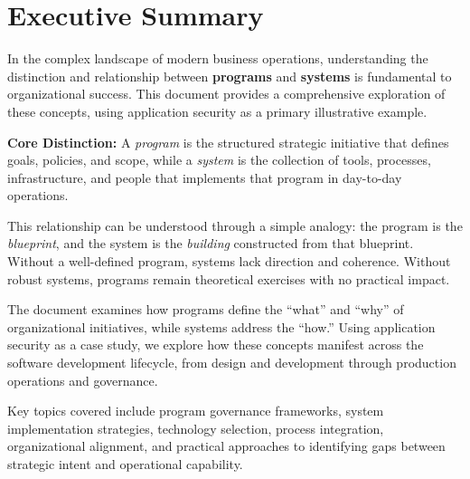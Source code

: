 \documentclass[11pt,letterpaper]{article}
\begin{document}
\tableofcontents
\thispagestyle{empty}
\newpage
\setcounter{page}{1}

\section{Executive Summary}

In the complex landscape of modern business operations, understanding the distinction and relationship between \textbf{programs} and \textbf{systems} is fundamental to organizational success. This document provides a comprehensive exploration of these concepts, using application security as a primary illustrative example.

\begin{summarybox}
\textbf{Core Distinction:} A \textit{program} is the structured strategic initiative that defines goals, policies, and scope, while a \textit{system} is the collection of tools, processes, infrastructure, and people that implements that program in day-to-day operations.
\end{summarybox}

This relationship can be understood through a simple analogy: the program is the \textit{blueprint}, and the system is the \textit{building} constructed from that blueprint. Without a well-defined program, systems lack direction and coherence. Without robust systems, programs remain theoretical exercises with no practical impact.

The document examines how programs define the ``what'' and ``why'' of organizational initiatives, while systems address the ``how.'' Using application security as a case study, we explore how these concepts manifest across the software development lifecycle, from design and development through production operations and governance.

Key topics covered include program governance frameworks, system implementation strategies, technology selection, process integration, organizational alignment, and practical approaches to identifying gaps between strategic intent and operational capability.

\end{document}
